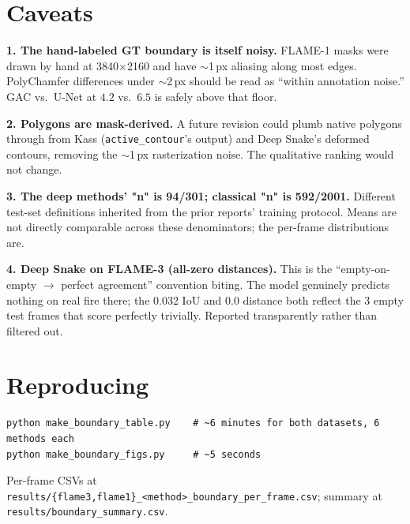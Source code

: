 \documentclass[10pt]{article}
\begin{document}
\section{Caveats}

\textbf{1. The hand-labeled GT boundary is itself noisy.} FLAME-1 masks were
drawn by hand at 3840$\times$2160 and have $\sim$1\,px aliasing along most
edges. PolyChamfer differences under $\sim$2\,px should be read as ``within
annotation noise.'' GAC vs.\ U-Net at $4.2$ vs.\ $6.5$ is safely above that
floor.

\textbf{2. Polygons are mask-derived.} A future revision could plumb native
polygons through from Kass (\texttt{active\_contour}'s output) and Deep
Snake's deformed contours, removing the $\sim$1\,px rasterization noise. The
qualitative ranking would not change.

\textbf{3. The deep methods' "n" is 94/301; classical "n" is 592/2001.}
Different test-set definitions inherited from the prior reports' training
protocol. Means are not directly comparable across these denominators; the
per-frame distributions are.

\textbf{4. Deep Snake on FLAME-3 (all-zero distances).} This is the
``empty-on-empty $\to$ perfect agreement'' convention biting. The model
genuinely predicts nothing on real fire there; the 0.032 IoU and 0.0 distance
both reflect the 3 empty test frames that score perfectly trivially.
Reported transparently rather than filtered out.

\section{Reproducing}

\begin{verbatim}
python make_boundary_table.py    # ~6 minutes for both datasets, 6 methods each
python make_boundary_figs.py     # ~5 seconds
\end{verbatim}

Per-frame CSVs at \texttt{results/\{flame3,flame1\}\_<method>\_boundary\_per\_frame.csv};
summary at \texttt{results/boundary\_summary.csv}.
\end{document}
